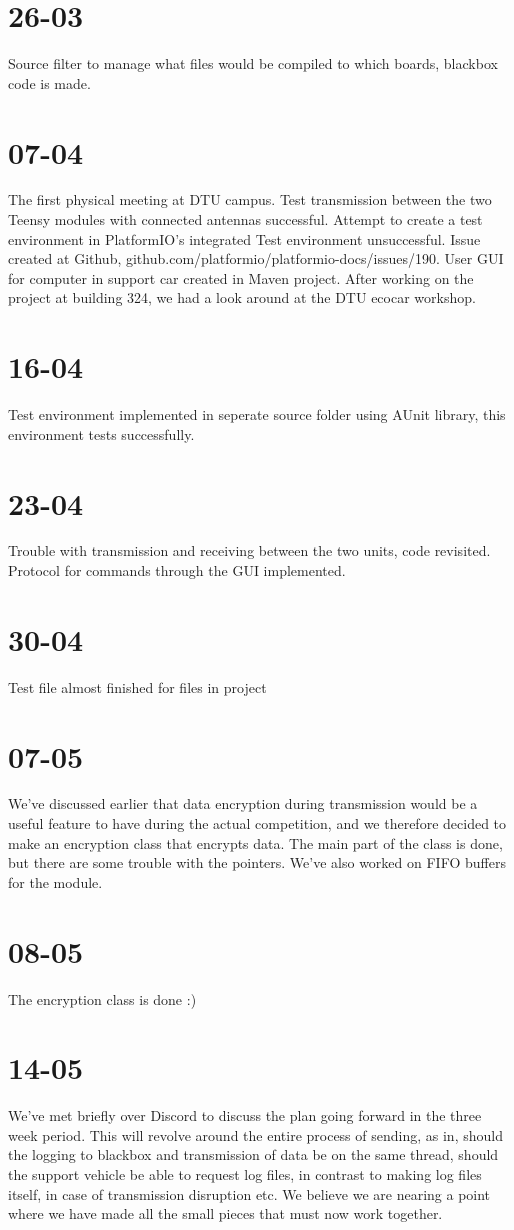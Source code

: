 \documentclass[]{article}
\begin{document}
\section{26-03}
Source filter to manage what files would be compiled to which boards, blackbox code is made.

\section{07-04}
The first physical meeting at DTU campus. Test transmission between the two Teensy modules with connected antennas successful. Attempt to create a test environment in PlatformIO's integrated Test environment unsuccessful. Issue created at Github, github.com/platformio/platformio-docs/issues/190. User GUI for computer in support car created in Maven project. After working on the project at building 324, we had a look around at the DTU ecocar workshop.

\section{16-04}
Test environment implemented in seperate source folder using AUnit library, this environment tests successfully.

\section{23-04}
Trouble with transmission and receiving between the two units, code revisited. Protocol for commands through the GUI implemented.

\section{30-04}
Test file almost finished for files in project

\section{07-05}
We've discussed earlier that data encryption during transmission would be a useful feature to have during the actual competition, and we therefore decided to make an encryption class that encrypts data. The main part of the class is done, but there are some trouble with the pointers. We've also worked on FIFO buffers for the module.

\section{08-05}
The encryption class is done :)

\section{14-05}
We've met briefly over Discord to discuss the plan going forward in the three week period. This will revolve around the entire process of sending, as in, should the logging to blackbox and transmission of data be on the same thread, should the support vehicle be able to request log files, in contrast to making log files itself, in case of transmission disruption etc. We believe we are nearing a point where we have made all the small pieces that must now work together.
\end{document}
